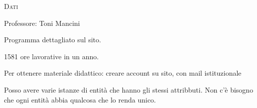 \documentclass[a4paper,10pt]{article} %
\newcommand{\msection}[1]{%
    {\normalsize \textsc {#1}\\[1ex]}}
\begin{document}
\msection{Dati}

Professore: Toni Mancini

Programma dettagliato sul sito.

1581 ore lavorative in un anno.

Per ottenere materiale didattico: creare account su sito, con mail istituzionale


Posso avere varie istanze di entità che hanno gli stessi attribbuti. Non c'è bisogno che ogni entità abbia qualcosa che lo renda unico.
\end{document}
